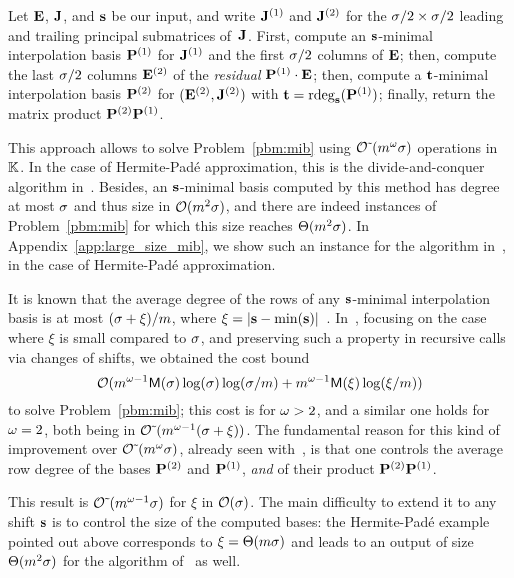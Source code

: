 \documentclass[preprint]{sig-alternate-05-2015}
\begin{document}
Let $\evMat$, $\mulmat$, and $\shifts$ be our input, and write $\mulmat^{(1)}$
and $\mulmat^{(2)}$ for the $\order/2\times\order/2$ leading and trailing
principal submatrices of~$\mulmat$. First, compute an $\shifts$-minimal
interpolation basis $\intBasis^{(1)}$ for $\mulmat^{(1)}$ and the first
$\order/2$ columns of $\evMat$; then, compute the last $\order/2$ columns
$\evMat^{(2)}$ of the \emph{residual} $\intBasis^{(1)} \mul \evMat$; then,
compute a $\shifts[t]$-minimal interpolation basis $\intBasis^{(2)}$ for
$(\evMat^{(2)},\mulmat^{(2)})$ with $\shifts[t] =
\rdeg[\shifts]{\intBasis^{(1)}}$; finally, return the matrix product
$\intBasis^{(2)} \intBasis^{(1)}$. 

This approach allows  to solve Problem~\ref{pbm:mib} using
$\softO{\rdim^\expmatmul \order}$ operations in $\field$. In the case of
Hermite-Pad\'e approximation, this is the divide-and-conquer algorithm
in~\cite{BecLab94}. Besides, an $\shifts$-minimal basis computed by this
method has degree at most $\order$ and thus size in $\bigO{\rdim^2 \order}$,
and there are indeed instances of Problem~\ref{pbm:mib} for which this size
reaches $\Theta(\rdim^2 \order)$. In Appendix~\ref{app:large_size_mib}, we show
such an instance for the algorithm in~\cite{BecLab94}, in the case of
Hermite-Pad\'e approximation.

It is known that the average degree of the rows of any $\shifts$-minimal
interpolation basis is at most $(\order + \xi)/\rdim$, where $\xi =
\sshifts[\shifts-\min(\shifts)]$~\cite[Theorem~4.1]{BarBul92}.
In~\cite{JeNeScVi15}, focusing on the case where $\xi$ is small compared to
$\order$, and preserving such a property in recursive calls via changes of
shifts, we obtained the cost bound 
\begin{equation}\label{eq:costJeNeScVi15}
   \bigO{  \rdim^{\expmatmul-1} \polmultime{\order} \log(\order)
   \log(\order/\rdim) + \rdim^{\expmatmul-1} \polmultime{\xi} \log(\xi/\rdim)}
\end{equation}
to solve Problem~\ref{pbm:mib}; this cost is for $\expmatmul>2$, and a similar
one holds for $\expmatmul=2$, both being in $\softO{\rdim^{\expmatmul-1}
(\order + \xi)}$. The fundamental reason for this kind of improvement over
$\softO{\rdim^\expmatmul \order}$, already seen with~\cite{ZhoLab12},  is that
one controls the average row degree of the bases $\intBasis^{(2)}$ and
$\intBasis^{(1)}$, \emph{and} of their product $\intBasis^{(2)}
\intBasis^{(1)}$.

This result is $\softO{\rdim^{\expmatmul-1} \order}$ for $\xi$ in $\bigO
\order$. The main difficulty to extend it to any shift $\shifts$ is to control
the size of the computed bases: the Hermite-Pad\'e example pointed out above
corresponds to $\xi =\Theta(\rdim\order)$ and leads to an output of size
$\Theta(\rdim^2 \order)$ for the algorithm of~\cite{JeNeScVi15} as well.
\end{document}

